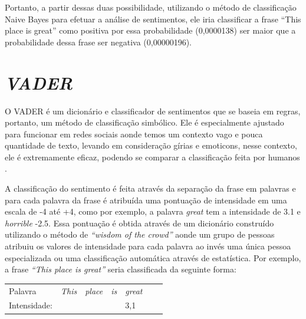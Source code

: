 Portanto, a partir dessas duas possibilidade, utilizando o método de
classificação Naive Bayes para efetuar a análise de sentimentos, ele iria
classificar a frase ``This place is great'' como positiva por essa probabilidade
(0,0000138) ser maior que a probabilidade dessa frase ser negativa (0,00000196).



\section{\textit{VADER}}

O \ac{VADER} é um dicionário e classificador de sentimentos que se baseia em
regras, portanto, um método de classificação simbólico. Ele é especialmente
ajustado para funcionar em redes sociais aonde temos um contexto vago e pouca
quantidade de texto, levando em consideração
gírias e emoticons, nesse contexto, ele é extremamente eficaz, podendo se
comparar a classificação feita por humanos \cite{conf/icwsm/HuttoG14}.

A classificação do sentimento é feita através da separação da frase em palavras
e para cada palavra da frase é atribuída uma pontuação de intensidade em uma escala de -4 até +4, como por exemplo, a palavra \textit{great} tem a
intensidade de 3.1 e \textit{horrible} -2.5. Essa pontuação é obtida
através de um dicionário construído utilizando o método de \textit{``wisdom of
the crowd''} aonde um grupo de pessoas atribuiu os valores de intensidade para
cada palavra ao invés uma única pessoa especializada ou uma classificação
automática através de estatística. Por
exemplo, a frase \textit{``This place is great''} seria classificada da seguinte forma:


\begin{table}[htb]
\centering
\begin{tabular}{l|l|l|l|l|l|l}
Palavra         & \textit{This}        & \textit{place} & \textit{is}      &
\textit{great}
\\
Intensidade:   &  &   &  & 3,1
\end{tabular}
\label{my-label}
\end{table}

